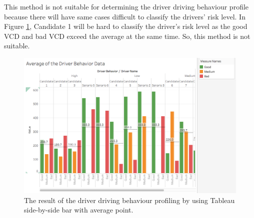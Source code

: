 This method is not suitable for determining the driver driving behaviour profile because there will have same cases difficult to classify the drivers' risk level. In Figure \ref{fig:Tresult}, Candidate 1 will be hard to classify the driver's risk level as the good VCD and bad VCD exceed the average at the same time. So, this method is not suitable.
 
\begin{figure}[hbt!]\centering
\includegraphics[width=.75\textwidth]{image/Tresult}
\caption{The result of the driver driving behaviour profiling by using Tableau side-by-side bar with average point.}
\label{fig:Tresult}
\end{figure} 